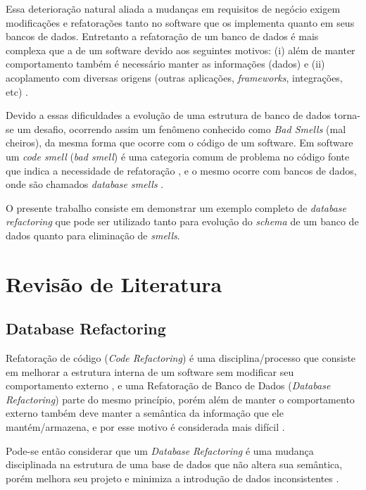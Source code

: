 \documentclass[10pt]{article}
\begin{document}
	Essa deterioração natural aliada a mudanças em requisitos de negócio exigem modificações e refatorações tanto no software que os implementa quanto em seus bancos de dados. Entretanto a refatoração de um banco de dados é mais complexa que a de um software devido aos seguintes motivos: (i) além de manter comportamento também é necessário manter as informações (dados) e (ii) acoplamento com diversas origens (outras aplicações, \textit{frameworks}, integrações, etc) \cite{Ambler:RefactoringDatabases}.

	Devido a essas dificuldades a evolução de uma estrutura de banco de dados torna-se um desafio, ocorrendo assim um fenômeno conhecido como \textit{Bad Smells} (mal cheiros), da mesma forma que ocorre com o código de um software. Em software um \textit{code smell} (\textit{bad smell}) é uma categoria comum de problema no código fonte que indica a necessidade de refatoração \cite{Fowler:Refatoracao}, e o mesmo ocorre com bancos de dados, onde são chamados \textit{database smells} \cite{Ambler:RefactoringDatabases}.

	O presente trabalho consiste em demonstrar um exemplo completo de \textit{database refactoring} que pode ser utilizado tanto para evolução do \textit{schema} de um banco de dados quanto para eliminação de \textit{smells}.


\section{Revisão de Literatura}\label{sec:revliteratura}

\subsection{Database Refactoring}
	Refatoração de código (\textit{Code Refactoring}) é uma disciplina/processo que consiste em melhorar a estrutura interna de um software sem modificar seu comportamento externo \cite{Fowler:Refatoracao}, e uma Refatoração de Banco de Dados (\textit{Database Refactoring}) parte do mesmo princípio, porém além de manter o comportamento externo também deve manter a semântica da informação que ele mantém/armazena, e por esse motivo é considerada mais difícil \cite{Ambler:RefactoringDatabases}.

	Pode-se então considerar que um \textit{Database Refactoring} é uma mudança disciplinada na estrutura de uma base de dados que não altera sua semântica, porém melhora seu projeto e minimiza a introdução de dados inconsistentes \cite{Mello:DatabaseRefactoring}.
\end{document}
